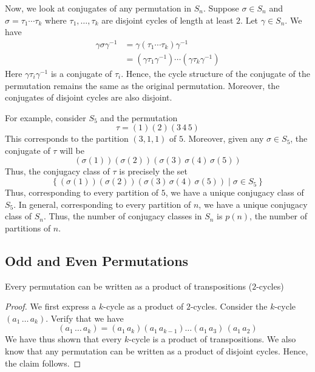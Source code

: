 \medskip

Now, we look at conjugates of any permutation in $S_n$. Suppose $\sigma \in S_n$ and $\sigma = \tau_1\cdots\tau_k$ where $\tau_1,\ldots,\tau_k$ are disjoint cycles of length at least $2$. Let $\gamma \in S_n$. We have
\begin{align*}
    \gamma\sigma\gamma^{-1} &= \gamma(\tau_1 \cdots \tau_k)\gamma^{-1} \\
    &= (\gamma\tau_1\gamma^{-1}) \cdots (\gamma\tau_k\gamma^{-1})
\end{align*}
Here $\gamma\tau_i\gamma^{-1}$ is a conjugate of $\tau_i$. Hence, the cycle structure of the conjugate of the permutation remains the same as the original permutation. Moreover, the conjugates of disjoint cycles are also disjoint. 

For example, consider $S_5$ and the permutation
\[
    \tau = (1) (2) (3 \, 4 \, 5)
\]
This corresponds to the partition $(3,1,1)$ of $5$. Moreover, given any $\sigma \in S_5$, the conjugate of $\tau$ will be
\[
    (\sigma(1)) (\sigma(2)) \left( \sigma(3) \, \sigma(4) \, \sigma(5) \right)
\]
Thus, the conjugacy class of $\tau$ is precisely the set
\[
    \left\{ (\sigma(1)) (\sigma(2)) \left( \sigma(3) \, \sigma(4) \, \sigma(5) \right) \mid \sigma \in S_5 \right\}
\]
Thus, corresponding to every partition of $5$, we have a unique conjugacy class of $S_5$. In general, corresponding to every partition of $n$, we have a unique conjugacy class of $S_n$. Thus, the number of conjugacy classes in $S_n$ is $p(n)$, the number of partitions of $n$.

\subsection{Odd and Even Permutations}

\begin{prop} \label{prop:perm-prod-of-transpositions}
    Every permutation can be written as a product of transpositions ($2$-cycles)
\end{prop}
\begin{proof}
    We first express a $k$-cycle as a product of $2$-cycles. Consider the $k$-cycle $(a_1 \, \ldots \, a_k)$. Verify that we have
    \[
        (a_1 \, \ldots \, a_k) = (a_1 \, a_k) (a_1 \, a_{k-1}) \ldots (a_1 \, a_3) \, (a_1 \, a_2)
    \]
    We have thus shown that every $k$-cycle is a product of transpositions. We also know that any permutation can be written as a product of disjoint cycles. Hence, the claim follows.
\end{proof}

